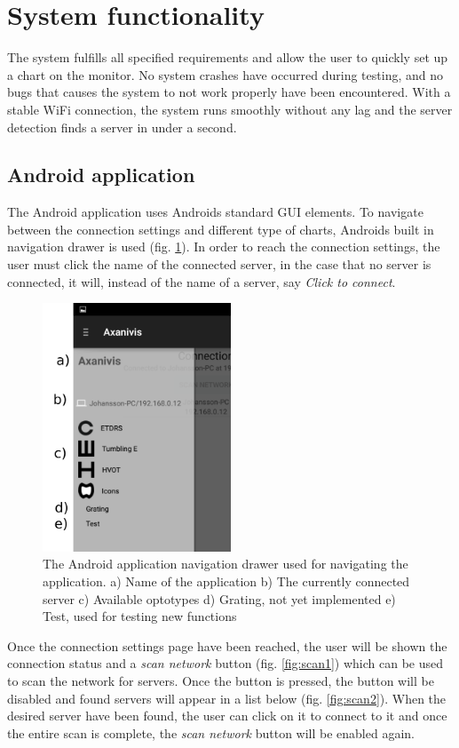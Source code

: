 \documentclass[12pt,a4paper,notitlepage]{report}
\begin{document}
\section{System functionality} 
The system fulfills all specified requirements and allow the user to quickly set up a chart on the monitor. No system crashes have occurred during testing, and no bugs that causes the system to not work properly have been encountered. With a stable WiFi connection, the system runs smoothly without any lag and the server detection finds a server in under a second. 

\subsection{Android application}
The Android application uses Androids standard GUI elements. To navigate between the connection settings and different type of charts, Androids built in navigation drawer is used (fig. \ref{fig:app_nav_drawer}). In order to reach the connection settings, the user must click the name of the connected server, in the case that no server is connected, it will, instead of the name of a server, say \textit{Click to connect}.

\begin{figure}[ht!]
\centering
\includegraphics[width=56mm]{images/appgui/nav_drawer.png}
\caption{The Android application navigation drawer used for navigating the application. a) Name of the application b) The currently connected server c) Available optotypes d) Grating, not yet implemented e) Test, used for testing new functions}
\label{fig:app_nav_drawer}
\end{figure}

Once the connection settings page have been reached, the user will be shown the connection status and a \textit{scan network} button (fig. \ref{fig:scan1}) which can be used to scan the network for servers. Once the button is pressed, the button will be disabled and found servers will appear in a list below (fig. \ref{fig:scan2}). When the desired server have been found, the user can click on it to connect to it and once the entire scan is complete, the \textit{scan network} button will be enabled again.
\end{document}
